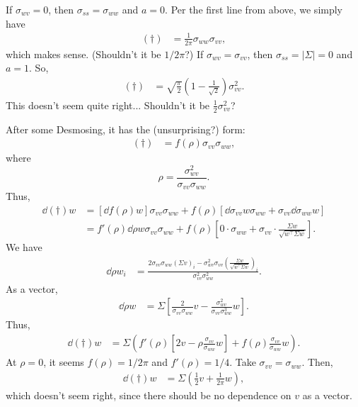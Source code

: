 \documentclass{article}
\begin{document}
If $\sigma_{wv} = 0$, then $\sigma_{ss} = \sigma_{ww}$ and $a = 0$.
Per the first line from above, we simply have
\begin{align*}
    (\dagger)
    &= \frac{1}{2 \pi} \sigma_{ww} \sigma_{vv},
\end{align*}
which makes sense.
(Shouldn't it be $1/2\pi$?)
If $\sigma_{wv} = \sigma_{vv}$, then $\sigma_{ss} = |\Sigma| = 0$ and $a = 1$.
So,
\begin{align*}
   (\dagger)
    &= \sqrt{\frac{\pi}{2}} \left( 1 - \frac{1}{\sqrt{2}} \right) \sigma_{vv}^2.
\end{align*}
This doesn't seem quite right... 
Shouldn't it be $\frac{1}{2} \sigma_{vv}^2$?

After some Desmosing, it has the (unsurprising?) form:
\begin{align*}
    (\dagger)
    &= f(\rho) \sigma_{vv} \sigma_{ww},
\end{align*}
where $$ \rho = \frac{\sigma_{wv}^2}{\sigma_{vv} \sigma_{ww}}. $$
Thus,
\begin{align*}
    \dd{(\dagger)}{w}
    &= \left[ \dd{f(\rho)}{w} \right] \sigma_{vv} \sigma_{ww} + f(\rho) \left[ \dd{\sigma_{vv}}{w} \sigma_{ww} + \sigma_{vv} \dd{\sigma_{ww}}{w} \right] \\
    &= f'(\rho) \dd{\rho}{w} \sigma_{vv} \sigma_{ww} + f(\rho) \left[ 0 \cdot \sigma_{ww} + \sigma_{vv} \cdot \frac{\Sigma w}{\sqrt{w^\top \Sigma w}} \right].
\end{align*}
We have
\begin{align*}
    \dd{\rho}{w_i}
    &= \frac{ 2 \sigma_{vv} \sigma_{ww} (\Sigma v)_i - \sigma_{wv}^2 \sigma_{vv} \left( \frac{\Sigma w}{\sqrt{w^\top \Sigma w}} \right)_i }{ \sigma_{vv}^2 \sigma_{ww}^2 }.
\end{align*}
As a vector,
\begin{align*}
    \dd{\rho}{w}
    &= \Sigma \left[ \frac{ 2 }{ \sigma_{vv} \sigma_{ww} } v
    - \frac{ \sigma_{wv}^2 }{ \sigma_{vv} \sigma_{ww}^3 } w \right].
\end{align*}
Thus,
\begin{align*}
    \dd{(\dagger)}{w}
    &= \Sigma \left( f'(\rho) \left[ 2 v - \rho \frac{ \sigma_{vv} }{ \sigma_{ww} } w \right] + f(\rho) \frac{\sigma_{vv}}{\sigma_{ww}} w \right).
\end{align*}
At $\rho = 0$, it seems $f(\rho) = 1/2\pi$ and $f'(\rho) = 1/4$.
Take $\sigma_{vv} = \sigma_{ww}$.
Then,
\begin{align*}
    \dd{(\dagger)}{w}
    &= \Sigma \left( \frac{1}{2} v + \frac{1}{2\pi} w \right),
\end{align*}
which doesn't seem right, since there should be no dependence on $v$ as a vector.
\end{document}
